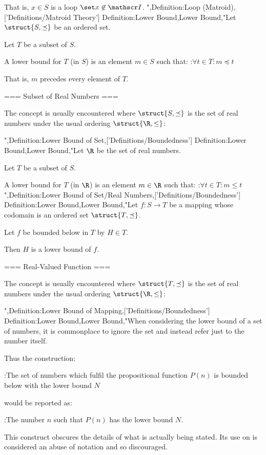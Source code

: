 That is, $x \in S$ is a loop  $\set x \not \in \mathscr I$.
",Definition:Loop (Matroid),['Definitions/Matroid Theory']
Definition:Lower Bound,Lower Bound,"Let $\struct {S, \preceq}$ be an ordered set.

Let $T$ be a subset of $S$.


A lower bound for $T$ (in $S$) is an element $m \in S$ such that:
:$\forall t \in T: m \preceq t$

That is, $m$ precedes every element of $T$.


=== Subset of Real Numbers ===

The concept is usually encountered where $\struct {S, \preceq}$ is the set of real numbers under the usual ordering $\struct {\R, \le}$:

",Definition:Lower Bound of Set,['Definitions/Boundedness']
Definition:Lower Bound,Lower Bound,"Let $\R$ be the set of real numbers.

Let $T$ be a subset of $S$.


A lower bound for $T$ (in $\R$) is an element $m \in \R$ such that:
:$\forall t \in T: m \le t$",Definition:Lower Bound of Set/Real Numbers,['Definitions/Boundedness']
Definition:Lower Bound,Lower Bound,"Let $f: S \to T$ be a mapping whose codomain is an ordered set $\struct {T, \preceq}$.


Let $f$ be bounded below in $T$ by $H \in T$.


Then $H$ is a lower bound of $f$.


=== Real-Valued Function ===

The concept is usually encountered where $\struct {T, \preceq}$ is the set of real numbers under the usual ordering $\struct {\R, \le}$:

",Definition:Lower Bound of Mapping,['Definitions/Boundedness']
Definition:Lower Bound,Lower Bound,"When considering the lower bound of a set of numbers, it is commonplace to ignore the set and instead refer just to the number itself.

Thus the construction:

:The set of numbers which fulfil the propositional function $P \left({n}\right)$ is bounded below with the lower bound $N$

would be reported as:

:The number $n$ such that $P \left({n}\right)$ has the lower bound $N$.


This construct obscures the details of what is actually being stated. Its use on  is considered an abuse of notation and so discouraged.


